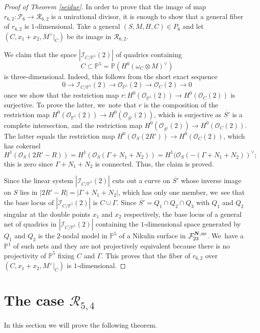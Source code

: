 \documentclass[JEP,XML,SOM,Unicode,NoEqCountersInSection,published]{cedram}
\newcommand{\ns}{{\mkern1mu\mathrm{ns}}}
\newcommand{\bN}{\boldsymbol{N}}
\theoremstyle{plain}
\theoremstyle{definition}
\newcommand\PP{{\mathbb P}}
\newcommand\F{{\mathcal F}}
\newcommand\I{{\mathcal I}}
\renewcommand\O{{\mathcal O}}
\renewcommand\P{{\mathcal P}}
\newcommand\R{{\mathcal R}}
\begin{document}
\begin{proof}[Proof of Theorem \ref{seidue}]
In order to prove that the image of map $r_{6,2}:\P_{6}\to \mathcal R_{6,2}$ is a unirational divisor, it is enough to show that a general fiber of $r_{6,2}$ is $1$-dimensional. Take a general $(S,M,H,C)\in P_{6}$ and let $(C,x_1+x_2,M^\vee|_C)$ be its image in $\mathcal R_{6,2}$.

We claim that the space $|\I_{C/\PP^5}(2)|$ of quadrics containing\vspace*{-3pt}
\[
C\subset\PP^5=\PP(H^0(\omega_C\otimes M)^\vee)
\]
is three-dimensional. Indeed, this follows from the short exact sequence\vspace*{-3pt}
\[
0 \to \I_{C/\PP^5}(2) \to \O_{\PP^5}(2) \to \O_C(2) \to 0
\]
once we show that the restriction map $r:H^0( \O_{\PP^5}(2)) \to H^0(\O_C(2))$ is surjective.
To prove the latter, we~note that $r$ is the composition of the restriction map \linebreak $H^0( \O_{\PP^5}(2)) \to H^0(\O_{\overline{S'}}(2))$, which is surjective as $\overline{S'}$ is a complete intersection, and the restriction map $H^0(\O_{\overline{S'}}(2))\to H^0(\O_C(2))$. The latter equals the restriction map $H^0(\O_S(2R')) \to H^0(\O_C(2))$, which has cokernel\vspace*{-3pt}
\[
 H^1(\O_S(2R'-R))=H^1(\O_S(\Gamma+N_1+N_2))=H^1(\O_S(-(\Gamma+N_1+N_2))^{\vee};
\]
this is zero since $\Gamma+N_1+N_2$ is connected. Thus, the claim is proved.

Since the linear system $|\I_{C/\PP^5}(2)|$ cuts out a curve on $\overline{S'}$ whose inverse image on $S$ lies in $|2R'-R|=|\Gamma+N_1+N_2|$, which has only one member, we~see that the base locus of $|\I_{C/\PP^5}(2)|$ is $C\cup \Gamma$. Since $\overline{S'}=Q_1\cap Q_2\cap Q_3$ with $Q_1$ and $Q_2$ singular at the double points $x_1$ and $x_2$ respectively, the base locus of a general net of quadrics in $|\I_{C/\PP^5}(2)|$ containing the $1$-dimensional space generated by $Q_1$ and $Q_2$ is the $2$-nodal model in $\PP^5$ of a Nikulin surface in $\F_{23}^{\bN,\ns}$. We~have a $\PP^1$ of such nets and they are not projectively equivalent because there is no projectivity of $\PP^5$ fixing $C$ and $\Gamma$. This proves that the fiber of $r_{6,2}$ over $(C,x_1+x_2,M^\vee|_C)$ is $1$-dimensional.
\end{proof}

\section{The case \texorpdfstring{$\R_{5,4}$}{R}}
In this section we will prove the following theorem.
\end{document}

